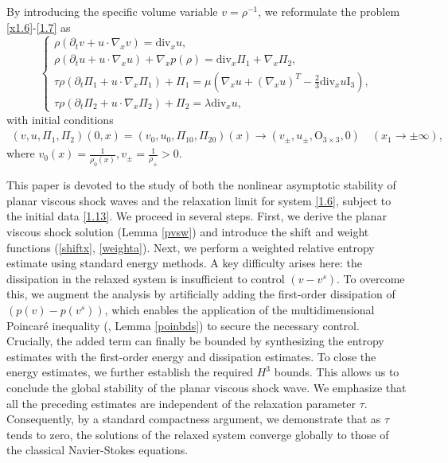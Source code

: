\documentclass[10pt,reqno]{amsart}
\numberwithin{equation}{section}
\newcommand{\ddiv}{\mathrm{div}}
\begin{document}
By introducing the specific volume variable $v=\rho^{-1}$,  we reformulate the problem \eqref{x1.6}-\eqref{1.7} as
\begin{equation}\label{1.6}
\begin{cases}
\rho(\partial_t v+u\cdot\nabla_x v)=\ddiv_x u,\\
 \rho(\partial_t u+ u\cdot\nabla_x u) +\nabla_x p(\rho)=\ddiv_x \Pi_1+\nabla_x\Pi_2,\\
\tau \rho \left(\partial_t\Pi_1+ u\cdot\nabla_x \Pi_1\right)+\Pi_1=
   \mu\left(\nabla_x u+(\nabla_x u)^T-\frac{2}{3}\ddiv_x u \mathrm I_3\right),\\
\tau \rho \left(\partial_t\Pi_2+ u\cdot\nabla_x \Pi_2\right)+\Pi_2=\lambda\ddiv_x u,
\end{cases}
\end{equation}
with initial conditions
\begin{align} \label{1.13}
(v, u, \Pi_1, \Pi_2)(0,x)=(v_0, u_0, \Pi_{10}, \Pi_{20})(x)
\rightarrow(v_{\pm}, u_{\pm}, \mathrm O_{3\times3}, 0) \quad (x_1\rightarrow\pm\infty),
\end{align}
where $v_0(x)=\frac{1}{\rho_0(x)},v_\pm=\frac{1}{\rho_\pm}>0$.

This paper is devoted to the study of both the nonlinear asymptotic stability of planar viscous shock waves and the relaxation limit for system \eqref{1.6}, subject to the initial data \eqref{1.13}. We proceed in several steps. First, we derive the planar viscous shock solution (Lemma \ref{pvsw}) and introduce the shift and weight functions (\eqref{shiftx}, \eqref{weighta}). Next, we perform a weighted relative entropy estimate using standard energy methods. A key difficulty arises here: the dissipation in the relaxed system is insufficient to control $(v-v^s)$. To overcome this, we augment the analysis by artificially adding the first-order dissipation of $(p(v)-p(v^s))$, which enables the application of the multidimensional Poincar\'e inequality (\cite{WWS}, Lemma \ref{poinbds}) to secure the necessary control. Crucially, the added term can finally be bounded by synthesizing the entropy estimates with the first-order energy and dissipation estimates. To close the energy estimates, we further establish the required $H^3$ bounds. This allows us to conclude the global stability of the planar viscous shock wave. We emphasize that all the preceding estimates are independent of the relaxation parameter $\tau$. Consequently, by a standard compactness argument, we demonstrate that as $\tau$ tends to zero, the solutions of the relaxed system converge globally to those of the classical Navier-Stokes equations.
\end{document}
